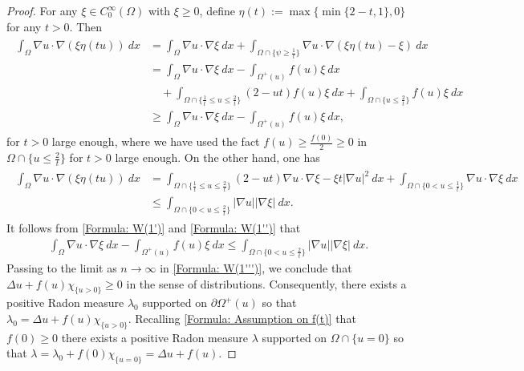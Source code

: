 \documentclass[11pt,reqno]{amsart}
\begin{document}
\begin{proof}
	For any $\xi\in C_{0}^{\infty}(\Omega)$ with $\xi\geqslant0$, define $\eta(t):=\max\{\min\{2-t,1\},0\}$ for any $t>0$. Then
	\begin{align}\label{Formula: W(1')}
		\begin{alignedat}{2}
			\int_{\Omega}\nabla u\cdot\nabla(\xi\eta(tu))\:dx&=\int_{\Omega}\nabla u\cdot\nabla\xi\:dx+\int_{\Omega\cap\{\psi\geqslant\tfrac{1}{t}\}}\nabla u\cdot\nabla(\xi\eta(tu)-\xi)\:dx\\
			&=\int_{\Omega}\nabla u\cdot\nabla\xi\:dx-\int_{\varOmega^{+}(u)}f(u)\xi\:dx\\
			&\quad+\int_{\Omega\cap\{\tfrac{1}{t}\leqslant u\leqslant\tfrac{2}{t}\}}(2-ut)f(u)\xi\:dx+\int_{\Omega\cap\{u\leqslant\tfrac{2}{t}\}}f(u)\xi\:dx\\
			&\geqslant\int_{\Omega}\nabla u\cdot\nabla\xi\:dx-\int_{\varOmega^{+}(u)}f(u)\xi\:dx,
		\end{alignedat}
	\end{align}
    for $t>0$ large enough, where we have used the fact $f(u)\geqslant\frac{f(0)}{2}\geqslant0$ in $\Omega\cap\{u\leqslant\tfrac{2}{t}\}$ for $t>0$ large enough. On the other hand, one has
    \begin{align}\label{Formula: W(1'')}
    	\begin{alignedat}{2}
    		\int_{\Omega}\nabla u\cdot\nabla(\xi\eta(tu))\:dx&=\int_{\Omega\cap\{\tfrac{1}{t}\leqslant u\leqslant\tfrac{2}{t}\}}(2-ut)\nabla u\cdot\nabla\xi-\xi t|\nabla u|^{2}\:dx+\int_{\Omega\cap\{0<u\leqslant\tfrac{1}{t}\}}\nabla u\cdot\nabla\xi\:dx\\
    		&\leqslant\int_{\Omega\cap\{0<u\leqslant\tfrac{2}{t}\}}|\nabla u||\nabla\xi|\:dx.
    	\end{alignedat}
    \end{align}
    It follows from \eqref{Formula: W(1')} and \eqref{Formula: W(1'')} that
    \begin{align}\label{Formula: W(1''')}
    	\int_{\Omega}\nabla u\cdot\nabla\xi\:dx-\int_{\varOmega^{+}(u)}f(u)\xi\:dx\leqslant\int_{\Omega\cap\{0<u\leqslant\tfrac{2}{t}\}}|\nabla u||\nabla\xi|\:dx.
    \end{align} 
   Passing to the limit as $n\to\infty$ in \eqref{Formula: W(1''')}, we conclude that $\Delta u+f(u)\chi_{\{u>0\}}\geqslant0$ in the sense of distributions. Consequently, there exists a positive Radon measure $\lambda_{0}$ supported on $\partial\varOmega^{+}(u)$ so that $\lambda_{0}=\Delta u+f(u)\chi_{\{u>0\}}$. Recalling \eqref{Formula: Assumption on f(t)} that $f(0)\geqslant0$ there exists a positive Radon measure $\lambda$ supported on $\Omega\cap\{u=0\}$ so that $\lambda=\lambda_{0}+f(0)\chi_{\{u=0\}}=\Delta u+f(u)$.
\end{proof}
\end{document}
